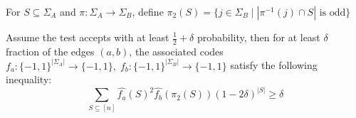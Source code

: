 \begin{definition}
  For $S \subseteq \Sigma_A$ and $\pi:\Sigma_A \rightarrow \Sigma_B$, define $\pi_2(S) = \{j \in \Sigma_B \mid |\pi^{-1}(j) \cap S| \text{ is odd}\}$
\end{definition}

\begin{lemma} \label{soundnessbound}
  Assume the test accepts with at least $\frac{1}{2} + \delta$ probability, then for at least $\delta$ fraction of the edges $(a,b)$, the associated codes $f_a:\{-1,1\}^{|\Sigma_A|} \rightarrow \{-1,1\}, \; f_b:\{-1,1\}^{|\Sigma_B|} \rightarrow \{-1,1\}$ satisfy the following inequality:
  \begin{equation}
  \sum_{S \subseteq [n]} \widehat{f_a}(S)^2\widehat{f_b}(\pi_2(S))(1-2\delta)^{|S|} \geq \delta
  \end{equation}
\end{lemma}
%
